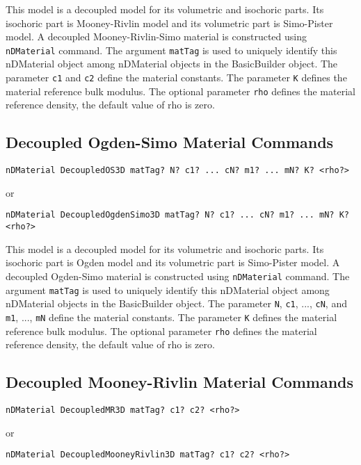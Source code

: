 This model is a decoupled model for its volumetric and isochoric parts.
Its isochoric part is Mooney-Rivlin model and its volumetric part is 
Simo-Pister model. 
A decoupled Mooney-Rivlin-Simo material is constructed using \texttt{nDMaterial} command.
The argument \texttt{matTag} is used to uniquely identify this nDMaterial object among 
nDMaterial objects in the BasicBuilder object. The parameter \texttt{c1} and \texttt{c2}
define the material constants. 
The parameter \texttt{K} defines the material reference bulk modulus. 
The optional parameter \texttt{rho} defines the material reference density, 
the default value of rho is zero. 


\subsection{Decoupled Ogden-Simo Material Commands}
\label{DOS}

\begin{verbatim}
nDMaterial DecoupledOS3D matTag? N? c1? ... cN? m1? ... mN? K? <rho?> 
\end{verbatim}
or
\begin{verbatim}
nDMaterial DecoupledOgdenSimo3D matTag? N? c1? ... cN? m1? ... mN? K? <rho?> 
\end{verbatim}

This model is a decoupled model for its volumetric and isochoric parts.
Its isochoric part is Ogden model and its volumetric part is Simo-Pister model. 
A decoupled Ogden-Simo material is constructed using \texttt{nDMaterial} command.
The argument \texttt{matTag} is used to uniquely identify this nDMaterial object among 
nDMaterial objects in the BasicBuilder object. The parameter \texttt{N},  
\texttt{c1}, ..., \texttt{cN}, and \texttt{m1}, ..., \texttt{mN} define the material constants. 
The parameter \texttt{K} defines the material reference bulk modulus. 
The optional parameter \texttt{rho} defines the material reference density, 
the default value of rho is zero. 


\subsection{Decoupled Mooney-Rivlin Material Commands}
\label{DMR}

\begin{verbatim}
nDMaterial DecoupledMR3D matTag? c1? c2? <rho?> 
\end{verbatim}
or
\begin{verbatim}
nDMaterial DecoupledMooneyRivlin3D matTag? c1? c2? <rho?> 
\end{verbatim}

